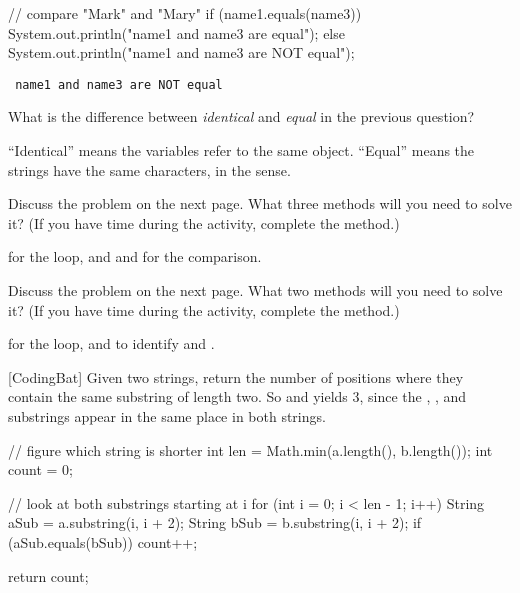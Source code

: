 \begin{javalst}
// compare "Mark" and "Mary"
if (name1.equals(name3)) {
    System.out.println("name1 and name3 are equal");
} else {
    System.out.println("name1 and name3 are NOT equal");
}
\end{javalst}

\vspace{-3ex}
\begin{answer}[1em]
\tt \hspace{1em} name1 and name3 are NOT equal
\end{answer}


\Q What is the difference between \emph{identical} and \emph{equal} in the previous question?

\begin{answer}
``Identical'' means the variables refer to the same  object.
``Equal'' means the strings have the same characters, in the  sense.
\end{answer}


\Q Discuss the  problem on the next page.
What three  methods will you need to solve it?
(If you have time during the activity, complete the method.)

\begin{answer}
 for the loop, and  and  for the comparison.
\end{answer}


\Q Discuss the  problem on the next page.
What two  methods will you need to solve it?
(If you have time during the activity, complete the method.)

\begin{answer}
 for the loop, and  to identify  and .
\end{answer}


\newpage

[CodingBat] Given two strings, return the number of positions where they contain the same substring of length two. So  and  yields 3, since the , , and  substrings appear in the same place in both strings.

\medskip
\begin{javalst}
public int stringMatch(String a, String b) {
\end{javalst}

\vspace{-1em}
\begin{answer}[18em]
\begin{javaans}
    // figure which string is shorter
    int len = Math.min(a.length(), b.length());
    int count = 0;

    // look at both substrings starting at i
    for (int i = 0; i < len - 1; i++) {
        String aSub = a.substring(i, i + 2);
        String bSub = b.substring(i, i + 2);
        if (aSub.equals(bSub)) {
            count++;
        }
    }

    return count;
\end{javaans}
\end{answer}

